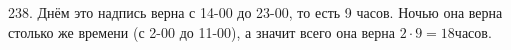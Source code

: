 238. Днём это надпись верна с 14-00 до 23-00, то есть 9 часов. Ночью она верна столько же времени (с 2-00 до 11-00), а значит всего она верна $2\cdot9=18$часов.\\
